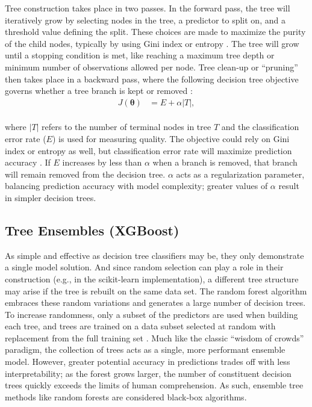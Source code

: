 Tree construction takes place in two passes. In the forward pass, the tree will iteratively grow by selecting nodes in the tree, a predictor to split on, and a threshold value defining the split. These choices are made to maximize the purity of the child nodes, typically by using Gini index or entropy \citep[p.\ 307]{james_introduction_2013}. The tree will grow until a stopping condition is met, like reaching a maximum tree depth or minimum number of observations allowed per node. Tree clean-up or ``pruning'' then takes place in a backward pass, where the following decision tree objective governs whether a tree branch is kept or removed \citep[p.\ 309]{james_introduction_2013}:
\begin{equation}
\label{dtree_objective}
\begin{aligned}
    J(\boldsymbol\theta) &= E + \alpha\left|T\right|,
\end{aligned}
\end{equation}
\\
where $\left|T\right|$ refers to the number of terminal nodes in tree $T$ and the classification error rate ($E$) is used for measuring quality. The objective could rely on Gini index or entropy as well, but classification error rate will maximize prediction accuracy \citep[p.\ 312]{james_introduction_2013}. If $E$ increases by less than $\alpha$ when a branch is removed, that branch will remain removed from the decision tree. $\alpha$ acts as a regularization parameter, balancing prediction accuracy with model complexity; greater values of $\alpha$ result in simpler decision trees.

\subsection{Tree Ensembles (XGBoost)}\label{ch3:tree_ensembles}

As simple and effective as decision tree classifiers may be, they only demonstrate a single model solution. And since random selection can play a role in their construction (e.g., in the scikit-learn implementation), a different tree structure may arise if the tree is rebuilt on the same data set. The random forest algorithm embraces these random variations and generates a large number of decision trees. To increase randomness, only a subset of the predictors are used when building each tree, and trees are trained on a data subset selected at random with replacement from the full training set \citep[p.\ 376--377]{bertsimas_analytics_2016}. Much like the classic ``wisdom of crowds'' paradigm, the collection of trees acts as a single, more performant ensemble model. However, greater potential accuracy in predictions trades off with less interpretability; as the forest grows larger, the number of constituent decision trees quickly exceeds the limits of human comprehension. As such, ensemble tree methods like random forests are considered black-box algorithms.

